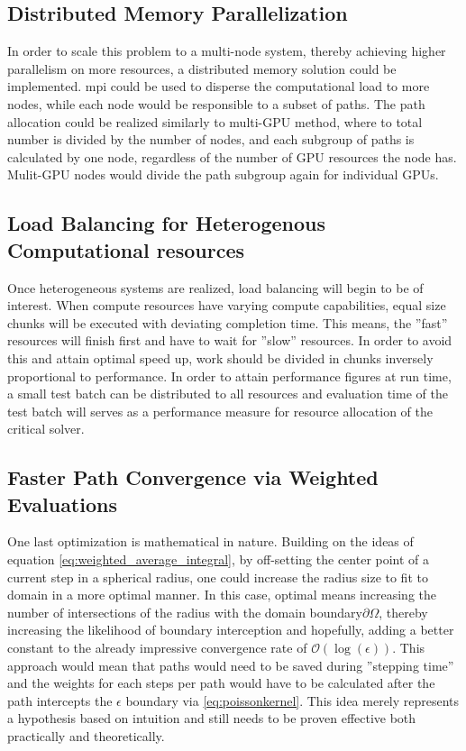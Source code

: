 \subsection{Distributed Memory Parallelization}

In order to scale this problem to a multi-node system, thereby achieving higher
parallelism on more resources, a distributed memory solution could be implemented.
\Gls{mpi} could be used to disperse the computational load to more nodes, while each
node would be responsible to a subset of paths.  The path allocation could be realized
similarly to multi-\gls{GPU} method, where to total number is divided by the number of nodes,
and each subgroup of paths is calculated by one node, regardless of the number of
\gls{GPU} resources the node has.  Mulit-GPU nodes would divide the path subgroup again
for individual \glspl{GPU}.

\subsection{Load Balancing for Heterogenous Computational resources}
Once heterogeneous systems are realized, load balancing will begin to be of interest.
When compute resources have varying compute capabilities, equal size chunks will
be executed with deviating completion time.  This means, the ''fast'' resources
will finish first and have to wait for ''slow'' resources.  In order to avoid this
and attain optimal speed up, work should be divided in chunks inversely proportional
to performance.  In order to attain performance figures at run time, a small test
batch can be distributed to all resources and evaluation time of the test batch will
serves as a performance measure for resource allocation of the critical solver.

\subsection{Faster Path Convergence via Weighted Evaluations}
One last optimization is mathematical in nature.  Building on the ideas of
equation \eqref{eq:weighted_average_integral}, by off-setting the center point of a current
step in a spherical radius, one could increase the radius size to fit to domain in a
more optimal manner.  In this case, optimal means increasing the number of intersections
of the radius with the domain boundary$\partial \Omega$, thereby increasing the likelihood of boundary
interception and hopefully, adding a better constant to the already impressive convergence
rate of $\mathcal{O}(\log(\epsilon))$.  This approach would mean that paths would need
to be saved during ''stepping time'' and the weights for
each steps per path would have to be calculated after the path intercepts the $\epsilon$
boundary via \eqref{eq:poissonkernel}.  This idea merely represents a hypothesis
based on intuition and still needs to be proven effective both practically and theoretically.
